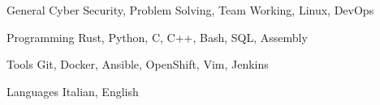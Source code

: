 
\begin{cvskills}

	\cvskill
	{General} %
	{Cyber Security, Problem Solving, Team Working, Linux, DevOps} %


	\cvskill
	{Programming} %
	{Rust, Python, C, C++, Bash, SQL, Assembly} %


	\cvskill
	{Tools} %
	{Git, Docker, Ansible, OpenShift, Vim, Jenkins} %


	\cvskill
	{Languages} %
	{Italian, English} %

\end{cvskills}
